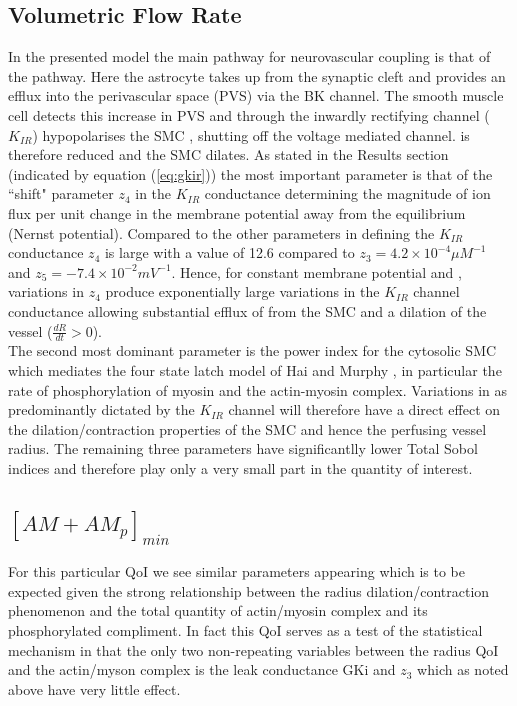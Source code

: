 \subsection{Volumetric Flow Rate}
In the presented model the main pathway for neurovascular coupling is that of the \pot pathway. Here the astrocyte takes up \pot from the synaptic cleft and provides an efflux into the perivascular space (PVS) via the BK channel. The smooth muscle cell detects this increase in PVS \pot and through the inwardly rectifying channel ($K_{IR}$) hypopolarises the SMC , shutting off the voltage mediated \ca channel.  \ca is therefore reduced and the SMC dilates. As stated in the Results section (indicated by equation (\ref{eq:gkir})) the most important parameter is that of the ``shift" parameter $z_4$ in the $K_{IR}$ conductance determining the magnitude of ion flux per unit change in the membrane potential away from the equilibrium (Nernst potential).  Compared to the other parameters in defining the $K_{IR}$ conductance $z_4$ is large with a value of 12.6 compared to $z_3=4.2 \times 10^{-4} \mu M^{-1}$ and $z_5 = -7.4 \times10^{-2} mV^{-1}$. Hence, for constant membrane potential and \pot,   variations in $z_4$ produce exponentially large variations in the $K_{IR}$ channel conductance allowing substantial efflux of \ca from the SMC and a dilation of the vessel ($\frac{dR}{dt}> 0$). \\

The second most dominant parameter is the power index for the cytosolic SMC \ca which mediates the four state latch model of Hai and Murphy \cite{Hai1988}, in particular the rate of phosphorylation of  myosin and the actin-myosin complex.  Variations in \ca as predominantly dictated by the $K_{IR}$ channel will therefore have a direct effect on the dilation/contraction properties of the SMC and hence the perfusing vessel radius.  
The remaining three parameters have significantlly lower Total Sobol indices and therefore play only a very small part in the quantity of interest.\\
 
\subsection{$[AM+AM_p]_{min}$}
For this particular QoI we see similar parameters appearing which is to be expected given the strong relationship between the radius dilation/contraction phenomenon and the total quantity of actin/myosin complex and its phosphorylated compliment. In fact this QoI serves as a test of the statistical mechanism in that the only two non-repeating variables between the radius QoI and the actin/myson complex is the leak conductance GKi and $z_3$ which as noted above have very little effect. 
